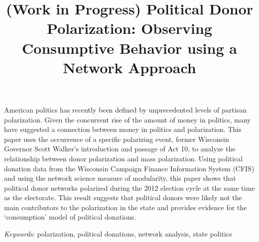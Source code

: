 \documentclass[12pt,]{article}
\title{(Work in Progress) Political Donor Polarization: Observing Consumptive
Behavior using a Network Approach  }
\author{\Large \vspace{0.05in} \newline\normalsize\emph{}  }
\date{}
\newcommand*{\authorfont}{\fontfamily{phv}\selectfont}
\renewenvironment{abstract}
 {{%
    \setlength{\leftmargin}{0mm}
    \setlength{\rightmargin}{\leftmargin}%
  }%
  \relax}
 {\endlist}
\begin{document}
	
%

{%
\setlength{\parindent}{0pt}
\thispagestyle{plain}
{\fontsize{18}{20}\selectfont\raggedright 
\maketitle  %

}

{
   \vskip 13.5pt\relax \normalsize\fontsize{11}{12} 
\textbf{\authorfont } \hskip 15pt \emph{\small }   

}

}








\begin{abstract}

    \hbox{\vrule height .2pt width 39.14pc}

    \vskip 8.5pt %

\noindent American politics has recently been defined by unprecedented levels of
partisan polarization. Given the concurrent rise of the amount of money
in politics, many have suggested a connection between money in politics
and polarization. This paper uses the occurrence of a specific
polarizing event, former Wisconsin Governor Scott Walker's introduction
and passage of Act 10, to analyze the relationship between donor
polarization and mass polarization. Using political donation data from
the Wisconsin Campaign Finance Information System (CFIS) and using the
network science measure of modularity, this paper shows that political
donor networks polarized during the 2012 election cycle at the same time
as the electorate. This result suggests that political donors were
likely not the main contributors to the polarization in the state and
provides evidence for the `consumption' model of political donations.


\vskip 8.5pt \noindent \emph{Keywords}: polarization, political donations, network analysis, state politics \par

    \hbox{\vrule height .2pt width 39.14pc}



\end{abstract}
\end{document}
